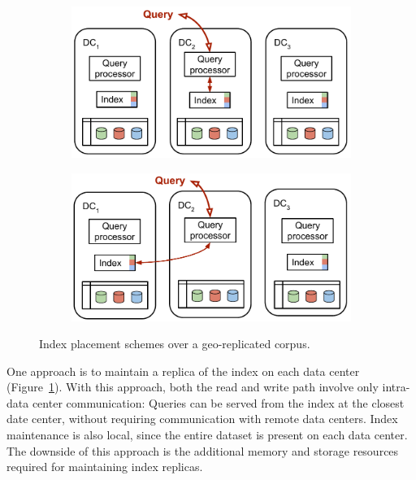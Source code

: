 \begin{figure}[H]
  \centering
  \begin{subfigure}[b]{0.48\textwidth}
    \centering
    \includegraphics[width=\textwidth]{./figures/design_space/index_full_replication.pdf}
    \caption{}
    \label{fig:index_full_replication}
  \end{subfigure}
  \hfill
  \begin{subfigure}[b]{0.48\textwidth}
    \centering
    \includegraphics[width=\textwidth]{./figures/design_space/index_partial_replication.pdf}
    \caption{}
    \label{fig:index_partial_replication}
  \end{subfigure}
  \caption{Index placement schemes over a geo-replicated corpus.}
  \label{fig:index_placement_geo_replication}
\end{figure}


One approach is to maintain a replica of the index on each data center (Figure~\ref{fig:index_full_replication}).
With this approach, both the read and write path involve only intra- data center communication:
Queries can be served from the index at the closest date center, without requiring communication with
remote data centers.
Index maintenance is also local, since the entire dataset is present on each data center.
The downside of this approach is the additional memory and storage resources required for maintaining index replicas.

